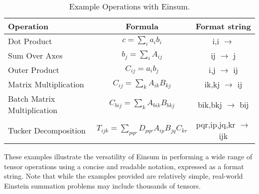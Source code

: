 \begin{table}[hbp]
    \caption{Example Operations with Einsum.}
    \label{tab:einsum:ops}
    \centering
    \def\arraystretch{1.1}
    \begin{tabular}{lcc}
        \toprule
        \textbf{Operation}                 & \textbf{Formula}                                    & \textbf{Format string}         \\
        \midrule
        Dot Product                        & $c = \sum_{i} a_{i} b_{i}$                          & i,i $\rightarrow$              \\
        Sum Over Axes                      & $b_{j} = \sum_{i} A_{ij}$                           & ij $\rightarrow$ j             \\
        Outer Product                      & $C_{ij} = a_{i} b_{j}$                              & i,j $\rightarrow$ ij           \\
        Matrix Multiplication              & $C_{ij} = \sum_{k} A_{ik} B_{kj}$                   & ik,kj $\rightarrow$ ij         \\
        Batch Matrix Multiplication        & $C_{bij} = \sum_{k} A_{bik} B_{bkj}$                & bik,bkj $\rightarrow$ bij      \\
        Tucker Decomposition \cite{tucker} & $T_{ijk} = \sum_{pqr} D_{pqr} A_{ip} B_{jq} C_{kr}$ & pqr,ip,jq,kr $\rightarrow$ ijk \\
        \bottomrule
    \end{tabular}
\end{table}

\noindent
These examples illustrate the versatility of Einsum in performing a wide range of 
tensor operations using a concise and readable notation, expressed as a format string.
Note that while the examples provided are relatively simple, real-world Einstein
summation problems may include thousands of tensors.